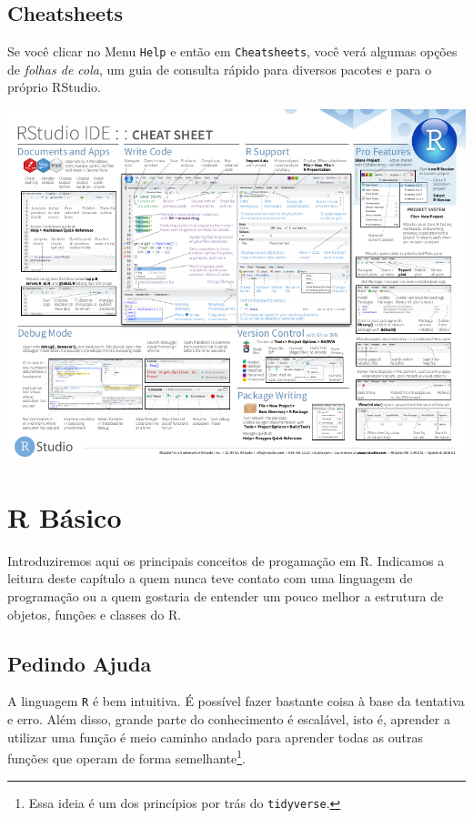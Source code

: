 \documentclass[]{book}
\let\rmarkdownfootnote\footnote%
\def\footnote{\protect\rmarkdownfootnote}
\begin{document}
\hypertarget{cheatsheets}{%
\section{Cheatsheets}\label{cheatsheets}}

Se você clicar no Menu \texttt{Help} e então em \texttt{Cheatsheets}, você verá algumas opções de \emph{folhas de cola}, um guia de consulta rápido para diversos pacotes e para o próprio RStudio.

\begin{center}\includegraphics[width=11.54in]{img/rstudio/cheatsheet-rstudio} \end{center}

\hypertarget{r-buxe1sico}{%
\chapter{R Básico}\label{r-buxe1sico}}

Introduziremos aqui os principais conceitos de progamação em R. Indicamos a leitura deste capítulo a quem nunca teve contato com uma linguagem de programação ou a quem gostaria de entender um pouco melhor a estrutura de objetos, funções e classes do R.

\hypertarget{pedindo-ajuda}{%
\section{Pedindo Ajuda}\label{pedindo-ajuda}}

A linguagem \texttt{R} é bem intuitiva. É possível fazer bastante coisa à base da tentativa e erro. Além disso, grande parte do conhecimento é escalável, isto é, aprender a utilizar uma função é meio caminho andado para aprender todas as outras funções que operam de forma semelhante\footnote{Essa ideia é um dos princípios por trás do \texttt{tidyverse}.}.
\end{document}
